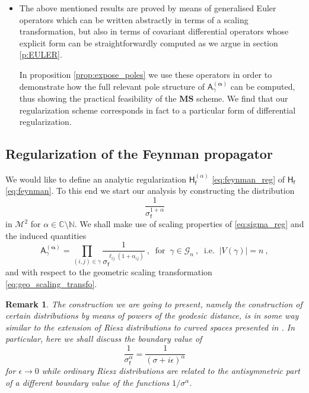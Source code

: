\documentclass[11pt]{book}
\newcommand{\MS}{\textbf{MS}}
\newcommand{\alphabd}{\boldsymbol{\alpha}}
\newcommand{\abs}[1]{\left|#1\right|}
\newcommand{\Gcal}{\mathcal{G}}
\newcommand{\Mcal}{\mathcal{M}}
\newcommand{\Cbb}{\mathbb{C}}
\newcommand{\Nbb}{\mathbb{N}}
\newcommand{\Asf}{\mathsf{A}}
\newcommand{\Hsf}{\mathsf{H}}
\newcommand{\fsf}{\mathsf{f}}
\theoremstyle{break}
\newtheorem{remark}{Remark}[chapter]
\begin{document}
\begin{itemize}
\item The above mentioned results are proved by means of generalised Euler operators which can be written abstractly in terms of a scaling transformation, but also in terms of covariant differential operators whose explicit form can be straightforwardly computed as we argue in section \ref{p:EULER}. 

In proposition \ref{prop:expose_poles} we use these operators in order to demonstrate how the full relevant pole structure of $\Asf_\gamma^{(\alphabd)}$ can be computed, thus showing the practical feasibility of the $\MS$ scheme. We find that our regularization scheme corresponds in fact to a particular form of differential regularization.


\end{itemize}




\subsection{Regularization of the Feynman propagator}
\label{p:REG_FEYNMAN_PROP}


We would like to define an analytic regularization $\Hsf^{(\alpha)}_\fsf$ \eqref{eq:feynman_reg} of $\Hsf_\fsf$ \eqref{eq:feynman}. To this end we start our analysis by constructing the distribution 
%
\begin{equation*}
\frac{1}{\sigma_\fsf^{1+\alpha}}
\end{equation*}
%
in $\Mcal^2$ for $\alpha \in \Cbb \setminus \Nbb$. We shall make use of scaling properties of
%
\eqref{eq:sigma_reg} and the induced quantities 
%
\begin{equation}
\Asf_\gamma^{(\alphabd)} = \prod_{(i,j)\in\gamma} \frac{1}{\sigma_\fsf^{\ell_{ij}(1+\alpha_{ij})}} \ , \ \mbox{ for } \ \gamma \in \Gcal_n \ , \ \mbox{ i.e. } \ \abs{V(\gamma)}=n \ ,
\label{eq:amplitude_sigma_reg}
\end{equation}
%
and with respect to the geometric scaling transformation \eqref{eq:geo_scaling_transfo}. 

\begin{remark}
The construction we are going to present, namely the construction of certain distributions by means of powers of the geodesic distance, is in some way similar to the extension of Riesz distributions to curved spaces presented in \cite{baer_wave_2008}. In particular, here we shall discuss the boundary value of 
%
\begin{equation*}
\frac{1}{\sigma_\fsf^\alpha} = \frac{1}{(\sigma+i\epsilon)^{\alpha}} 
\end{equation*}
%
for $\epsilon\to0$ while ordinary Riesz distributions are related to the antisymmetric part of a different boundary value of the functions $1/\sigma^\alpha$.
\end{remark}
\end{document}
